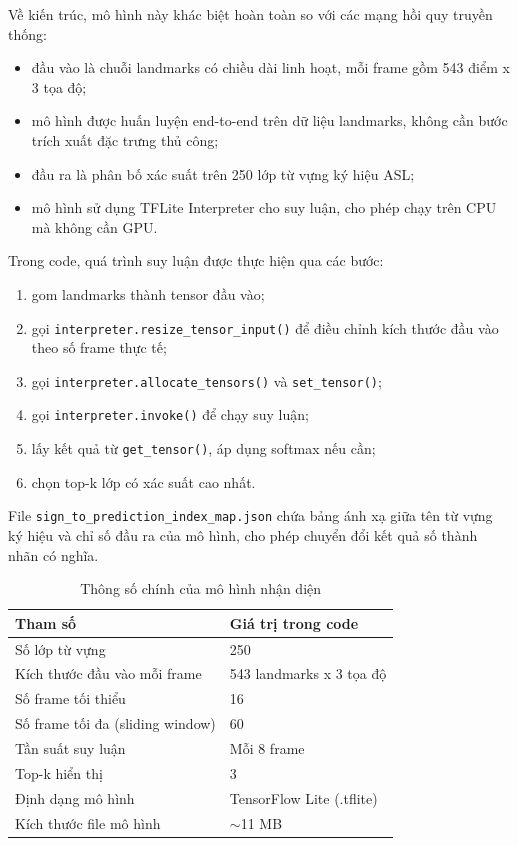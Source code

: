 Về kiến trúc, mô hình này khác biệt hoàn toàn so với các mạng hồi quy truyền thống:
\begin{itemize}
    \item đầu vào là chuỗi landmarks có chiều dài linh hoạt, mỗi frame gồm 543 điểm x 3 tọa độ;
    \item mô hình được huấn luyện end-to-end trên dữ liệu landmarks, không cần bước trích xuất
    đặc trưng thủ công;
    \item đầu ra là phân bố xác suất trên 250 lớp từ vựng ký hiệu ASL;
    \item mô hình sử dụng TFLite Interpreter cho suy luận, cho phép chạy trên CPU mà không cần GPU.
\end{itemize}

Trong code, quá trình suy luận được thực hiện qua các bước:
\begin{enumerate}
    \item gom landmarks thành tensor đầu vào;
    \item gọi \texttt{interpreter.resize\_tensor\_input()} để điều chỉnh kích thước đầu vào
    theo số frame thực tế;
    \item gọi \texttt{interpreter.allocate\_tensors()} và \texttt{set\_tensor()};
    \item gọi \texttt{interpreter.invoke()} để chạy suy luận;
    \item lấy kết quả từ \texttt{get\_tensor()}, áp dụng softmax nếu cần;
    \item chọn top-k lớp có xác suất cao nhất.
\end{enumerate}

File \texttt{sign\_to\_prediction\_index\_map.json} chứa bảng ánh xạ giữa tên từ vựng ký hiệu
và chỉ số đầu ra của mô hình, cho phép chuyển đổi kết quả số thành nhãn có nghĩa.

\begin{table}[H]
\centering
\caption{Thông số chính của mô hình nhận diện}
\label{tab:recognition-hyperparameters}
\begin{tabularx}{\textwidth}{|p{5cm}|X|}
\hline
\textbf{Tham số} & \textbf{Giá trị trong code} \\
\hline
Số lớp từ vựng & 250 \\
\hline
Kích thước đầu vào mỗi frame & 543 landmarks x 3 tọa độ \\
\hline
Số frame tối thiểu & 16 \\
\hline
Số frame tối đa (sliding window) & 60 \\
\hline
Tần suất suy luận & Mỗi 8 frame \\
\hline
Top-k hiển thị & 3 \\
\hline
Định dạng mô hình & TensorFlow Lite (.tflite) \\
\hline
Kích thước file mô hình & $\sim$11 MB \\
\hline
\end{tabularx}
\end{table}

